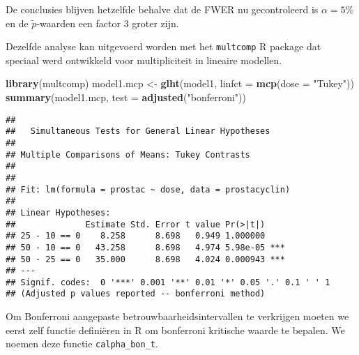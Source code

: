 \documentclass[
  12pt,dutch,coursenotes]{book}
\newenvironment{Shaded}{\begin{snugshade}}{\end{snugshade}}
\newcommand{\ControlFlowTok}[1]{\textcolor[rgb]{0.13,0.29,0.53}{\textbf{#1}}}
\newcommand{\DataTypeTok}[1]{\textcolor[rgb]{0.13,0.29,0.53}{#1}}
\newcommand{\DecValTok}[1]{\textcolor[rgb]{0.00,0.00,0.81}{#1}}
\newcommand{\KeywordTok}[1]{\textcolor[rgb]{0.13,0.29,0.53}{\textbf{#1}}}
\newcommand{\NormalTok}[1]{#1}
\newcommand{\OperatorTok}[1]{\textcolor[rgb]{0.81,0.36,0.00}{\textbf{#1}}}
\newcommand{\StringTok}[1]{\textcolor[rgb]{0.31,0.60,0.02}{#1}}
\theoremstyle{definition}
\theoremstyle{definition}
\theoremstyle{definition}
\theoremstyle{remark}
\begin{document}
De conclusies blijven hetzelfde behalve dat de FWER nu gecontroleerd is \(\alpha=5\%\) en de \(\tilde{p}\)-waarden een factor 3 groter zijn.

Dezelfde analyse kan uitgevoerd worden met het \texttt{multcomp} R package dat speciaal werd ontwikkeld voor multipliciteit in lineaire modellen.

\begin{Shaded}
\begin{Highlighting}[]
\KeywordTok{library}\NormalTok{(multcomp)}
\NormalTok{model1.mcp \textless{}{-}}\StringTok{ }\KeywordTok{glht}\NormalTok{(model1, }\DataTypeTok{linfct =} \KeywordTok{mcp}\NormalTok{(}\DataTypeTok{dose =} \StringTok{"Tukey"}\NormalTok{))}
\KeywordTok{summary}\NormalTok{(model1.mcp, }\DataTypeTok{test =} \KeywordTok{adjusted}\NormalTok{(}\StringTok{"bonferroni"}\NormalTok{))}
\end{Highlighting}
\end{Shaded}

\begin{verbatim}
## 
##   Simultaneous Tests for General Linear Hypotheses
## 
## Multiple Comparisons of Means: Tukey Contrasts
## 
## 
## Fit: lm(formula = prostac ~ dose, data = prostacyclin)
## 
## Linear Hypotheses:
##              Estimate Std. Error t value Pr(>|t|)    
## 25 - 10 == 0    8.258      8.698   0.949 1.000000    
## 50 - 10 == 0   43.258      8.698   4.974 5.98e-05 ***
## 50 - 25 == 0   35.000      8.698   4.024 0.000943 ***
## ---
## Signif. codes:  0 '***' 0.001 '**' 0.01 '*' 0.05 '.' 0.1 ' ' 1
## (Adjusted p values reported -- bonferroni method)
\end{verbatim}

Om Bonferroni aangepaste betrouwbaarheidsintervallen te verkrijgen moeten we eerst zelf functie definiëren in R om bonferroni kritische waarde te bepalen. We noemen deze functie \texttt{calpha\_bon\_t}.

\begin{Shaded}
\end{Shaded}
\end{document}
